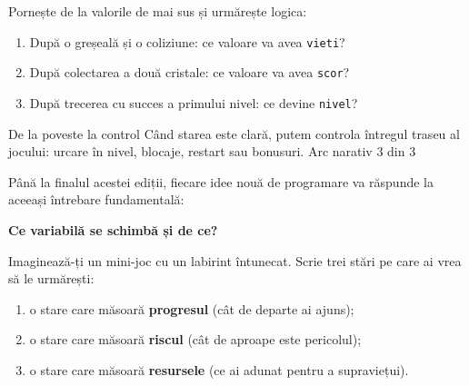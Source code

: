 \begin{guidebox}
Pornește de la valorile de mai sus și urmărește logica:
\begin{enumerate}
\item După o greșeală și o coliziune: ce valoare va avea \texttt{vieti}?
\item După colectarea a două cristale: ce valoare va avea \texttt{scor}?
\item După trecerea cu succes a primului nivel: ce devine \texttt{nivel}?
\end{enumerate}
\end{guidebox}

\clearpage

\PageHeader
  {De la poveste la control}
  {Când starea este clară, putem controla întregul traseu al jocului: urcare în nivel, blocaje, restart sau bonusuri.}
  {Arc narativ 3 din 3}

\begin{checkpointbox}
Până la finalul acestei ediții, fiecare idee nouă de programare va răspunde la aceeași întrebare fundamentală:
\begin{center}
\textbf{Ce variabilă se schimbă și de ce?}
\end{center}
\end{checkpointbox}

\begin{semibox}
Imaginează-ți un mini-joc cu un labirint întunecat. Scrie trei stări pe care ai vrea să le urmărești:
\begin{enumerate}
\item o stare care măsoară \textbf{progresul} (cât de departe ai ajuns);
\item o stare care măsoară \textbf{riscul} (cât de aproape este pericolul);
\item o stare care măsoară \textbf{resursele} (ce ai adunat pentru a supraviețui).
\end{enumerate}
\end{semibox}


